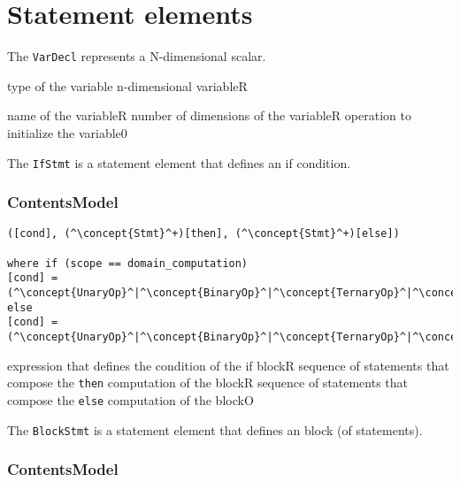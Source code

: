 \section{Statement elements}


The {\tt VarDecl} represents a N-dimensional scalar.

\begin{HIRChildElements}
	{type of the variable n-dimensional variable}{R}
\end{HIRChildElements}

\begin{HIRAttributes}
	{name of the variable}{R}
	{number of dimensions of the variable}{R}
	{operation to initialize the variable}{0}
\end{HIRAttributes}

The {\tt IfStmt} is a statement element that defines an if condition. 

\subsubsection*{ContentsModel}{}

\begin{lstlisting}[style=default]
([cond], (^\concept{Stmt}^+)[then], (^\concept{Stmt}^+)[else])

where if (scope == domain_computation)
[cond] = (^\concept{UnaryOp}^|^\concept{BinaryOp}^|^\concept{TernaryOp}^|^\concept{FieldAccess}^|^\concept{VarAccess}^|^\concept{Literal}^)
else
[cond] = (^\concept{UnaryOp}^|^\concept{BinaryOp}^|^\concept{TernaryOp}^|^\concept{VarAccess}^|^\concept{Literal}^)
\end{lstlisting}

\begin{HIRChildElements}
	{expression that defines the condition of the if block}{R}
	{sequence of statements that compose the {\tt then} computation of the block}{R}
	{sequence of statements that compose the {\tt else} computation of the block}{O}
\end{HIRChildElements}

The {\tt BlockStmt} is a statement element that defines an block (of statements). 

\subsubsection*{ContentsModel}{}


